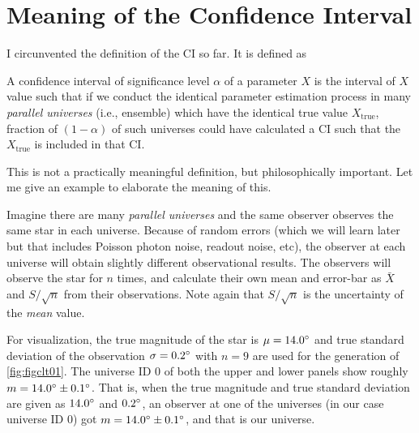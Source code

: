 \section{Meaning of the Confidence Interval}
I circunvented the definition of the CI so far. It is defined as

\begin{defn} 
  A confidence interval of significance level $ \alpha $ of a parameter $ X $ is the interval of $ X $ value such that if we conduct the identical parameter estimation process in many \textit{parallel universes} (i.e., ensemble) which have the identical true value $ X_\mathrm{true} $, fraction of $ (1 - \alpha) $ of such universes could have calculated a CI such that the $ X_\mathrm{true} $ is included in that CI.
\end{defn}

This is not a practically meaningful definition, but philosophically important. Let me give an example to elaborate the meaning of this.

\begin{ex}
  Imagine there are many \textit{parallel universes} and the same observer observes the same star in each universe. Because of random errors (which we will learn later but that includes Poisson photon noise, readout noise, etc), the observer at each universe will obtain slightly different observational results. The observers will observe the star for $ n $ times, and calculate their own mean and error-bar as $ \bar{X} $ and $ S / \sqrt{n} $ from their observations. Note again that  $ S / \sqrt{n} $ is the uncertainty of the \textit{mean} value.

  For visualization, the true magnitude of the star is $ \mu = \m{14.0} $ and true standard deviation of the observation $ \sigma = \m{0.2} $ with $ n = 9 $ are used for the generation of \cref{fig:figclt01}. The universe ID 0 of both the upper and lower panels show roughly $ m = \m{14.0} \pm \m{0.1} $. That is, when the true magnitude and true standard deviation are given as $ \m{14.0} $ and $ \m{0.2} $, an observer at one of the universes (in our case universe ID 0) got $ m = \m{14.0} \pm \m{0.1} $, and that is our universe. 
\end{ex}

